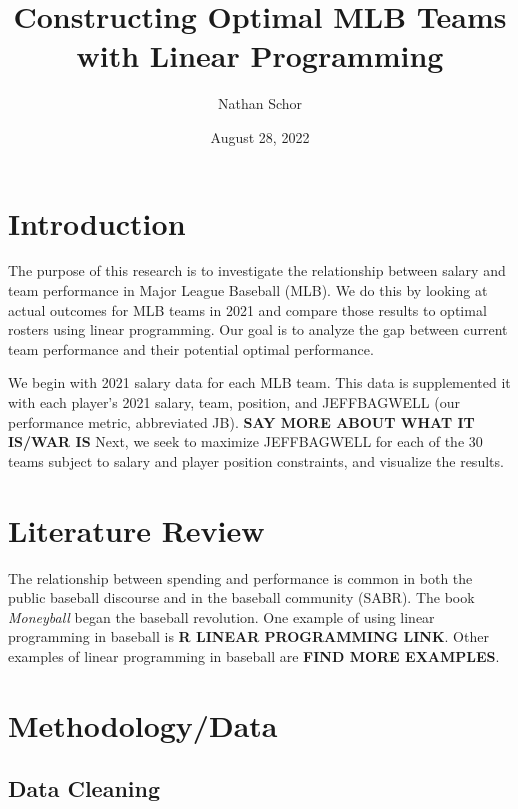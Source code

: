 \documentclass{article}
\title{Constructing Optimal MLB Teams with Linear Programming}
\author{Nathan Schor}
\date{August 28, 2022}
\begin{document}
\maketitle
\begin{singlespace}
\tableofcontents
\end{singlespace}

\newpage

\section{Introduction}

The purpose of this research is to investigate the relationship between salary and team performance in Major League Baseball (MLB). We do this by looking at actual outcomes for MLB teams in 2021 and compare those results to optimal rosters using linear programming. Our goal is to analyze the gap between current team performance and their potential optimal performance. 

We begin with 2021 salary data for each MLB team. This data is supplemented it with each player's 2021 salary, team, position, and JEFFBAGWELL (our performance metric, abbreviated JB). \textbf{SAY MORE ABOUT WHAT IT IS/WAR IS} Next, we seek to maximize JEFFBAGWELL for each of the 30 teams subject to salary and player position constraints, and visualize the results. 

\section{Literature Review}

The relationship between spending and performance is common in both the public baseball discourse and in the baseball community (SABR). The book \emph{Moneyball} began the baseball revolution. One example of using linear programming in baseball is \textbf{R LINEAR PROGRAMMING LINK}. Other examples of linear programming in baseball are \textbf{FIND MORE EXAMPLES}. 

\section{Methodology/Data}

\subsection{Data Cleaning}
\end{document}
